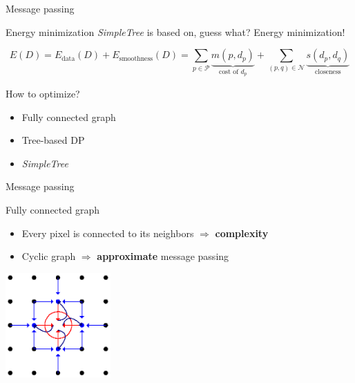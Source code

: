 \documentclass[12pt]{beamer}
\newcommand{\tmop}[1]{\ensuremath{\operatorname{#1}}}
\begin{document}
\begin{frame}{Message passing}
  \begin{block}{Energy minimization}
    \emph{SimpleTree} is based on, guess what? Energy minimization!

    \footnotesize
    \[ E \left( D \right) = E_{\tmop{data}} \left( D \right) +
       E_{\tmop{smoothness}} \left( D \right) = \sum_{p \in \mathcal{P}}
       \underbrace{m \left( p, d_p \right)}_{\text{cost of $d_p$}} + \sum_{\left(
       p, q \right) \in \mathcal{N}} \underbrace{s \left( d_p, d_q
       \right)}_{\text{closeness}} \]
  \end{block}

  \begin{block}{How to optimize?}
    \begin{itemize}
      \item Fully connected graph
      \item Tree-based DP
      \item \emph{SimpleTree}
    \end{itemize}
  \end{block}
\end{frame}

\begin{frame}{Message passing}
  \begin{block}{Fully connected graph}
    \begin{itemize}
      \item Every pixel is connected to its neighbors $\Rightarrow$ \textbf{complexity}
      \item Cyclic graph $\Rightarrow$ \textbf{approximate} message passing
    \end{itemize}

    \begin{center}
      \includegraphics[height=4cm]{graphics/disparity-wholetree.eps}
    \end{center}
  \end{block}
\end{frame}
\end{document}
